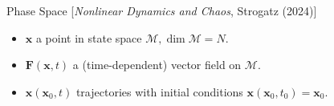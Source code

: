 \vspace{-0.08in}
\begin{exampleblock}{Phase Space
[{\it Nonlinear Dynamics and Chaos}, Strogatz (2024)]}
\begin{itemize}
\item $\mathbf{x}$ a point in state space $\mathcal{M}, \dim{\mathcal{M} = N} $.
\item $\mathbf{F} \left( \mathbf{x}, t \right)$
a (time-dependent) vector field on $\mathcal{M}$.
\item $\mathbf{x} \left( \mathbf{x}_0, t \right)$
trajectories with initial conditions
$\mathbf{x} \left( \mathbf{x}_0, t_0 \right) = \mathbf{x}_0$.
\end{itemize}
\end{exampleblock}
